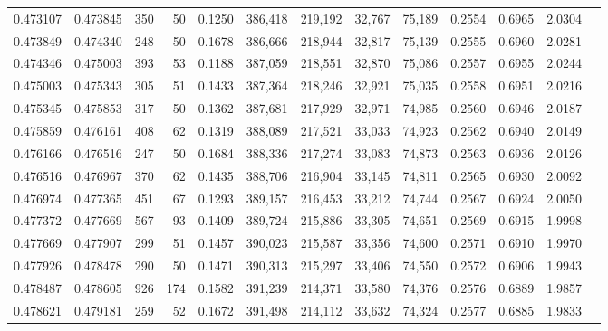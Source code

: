 \begin{tabular}{rrrrrrrrrrrrr}
0.473107 & 0.473845 &   350 &  50 &                                     0.1250 & 386,418 & 219,192 &  32,767 &  75,189 & 0.2554 & 0.6965 & 2.0304 \\
0.473849 & 0.474340 &   248 &  50 &                                     0.1678 & 386,666 & 218,944 &  32,817 &  75,139 & 0.2555 & 0.6960 & 2.0281 \\
0.474346 & 0.475003 &   393 &  53 &                                     0.1188 & 387,059 & 218,551 &  32,870 &  75,086 & 0.2557 & 0.6955 & 2.0244 \\
0.475003 & 0.475343 &   305 &  51 &                                     0.1433 & 387,364 & 218,246 &  32,921 &  75,035 & 0.2558 & 0.6951 & 2.0216 \\
0.475345 & 0.475853 &   317 &  50 &                                     0.1362 & 387,681 & 217,929 &  32,971 &  74,985 & 0.2560 & 0.6946 & 2.0187 \\
0.475859 & 0.476161 &   408 &  62 &                                     0.1319 & 388,089 & 217,521 &  33,033 &  74,923 & 0.2562 & 0.6940 & 2.0149 \\
0.476166 & 0.476516 &   247 &  50 &                                     0.1684 & 388,336 & 217,274 &  33,083 &  74,873 & 0.2563 & 0.6936 & 2.0126 \\
0.476516 & 0.476967 &   370 &  62 &                                     0.1435 & 388,706 & 216,904 &  33,145 &  74,811 & 0.2565 & 0.6930 & 2.0092 \\
0.476974 & 0.477365 &   451 &  67 &                                     0.1293 & 389,157 & 216,453 &  33,212 &  74,744 & 0.2567 & 0.6924 & 2.0050 \\
0.477372 & 0.477669 &   567 &  93 &                                     0.1409 & 389,724 & 215,886 &  33,305 &  74,651 & 0.2569 & 0.6915 & 1.9998 \\
0.477669 & 0.477907 &   299 &  51 &                                     0.1457 & 390,023 & 215,587 &  33,356 &  74,600 & 0.2571 & 0.6910 & 1.9970 \\
0.477926 & 0.478478 &   290 &  50 &                                     0.1471 & 390,313 & 215,297 &  33,406 &  74,550 & 0.2572 & 0.6906 & 1.9943 \\
0.478487 & 0.478605 &   926 & 174 &                                     0.1582 & 391,239 & 214,371 &  33,580 &  74,376 & 0.2576 & 0.6889 & 1.9857 \\
0.478621 & 0.479181 &   259 &  52 &                                     0.1672 & 391,498 & 214,112 &  33,632 &  74,324 & 0.2577 & 0.6885 & 1.9833 \\

\end{tabular}
